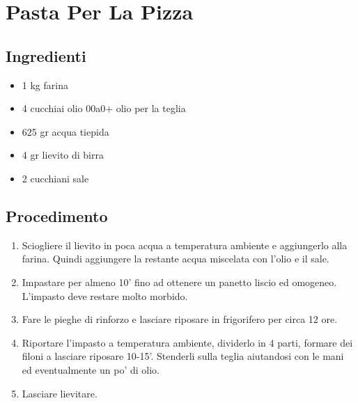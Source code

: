 \section{Pasta Per La Pizza}
\subsection{Ingredienti}
\begin{itemize}
\item 1 kg farina   
\item 4 cucchiai olio 00a0+ olio per la teglia  
\item 625 gr acqua tiepida  
\item 4 gr lievito di birra  
\item 2 cucchiani sale
\end{itemize}
\subsection{Procedimento}
\begin{enumerate}
\item  Sciogliere il lievito in poca acqua a temperatura ambiente e aggiungerlo alla farina. Quindi aggiungere la restante acqua miscelata con l'olio e il sale.  
\item  Impastare per almeno 10' fino ad ottenere un panetto liscio ed omogeneo. L'impasto deve restare molto morbido.   
\item  Fare le pieghe di rinforzo e lasciare riposare in frigorifero per circa 12 ore.  
\item  Riportare l'impasto a temperatura ambiente, dividerlo in 4 parti, formare dei filoni a lasciare riposare 10-15'. Stenderli sulla teglia aiutandosi con le mani ed eventualmente un po' di olio.  
\item  Lasciare lievitare.
\end{enumerate}
